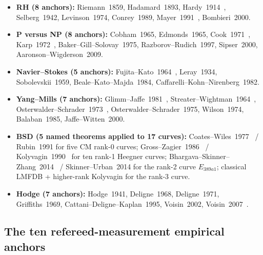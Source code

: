 \documentclass[11pt,a4paper]{amsart}
\theoremstyle{plain}
\theoremstyle{definition}
\begin{document}
\begin{itemize}[itemsep=2pt]
\item \textbf{RH (8 anchors):} Riemann~1859, Hadamard~1893, Hardy~1914~\cite{hardy1914}, Selberg~1942, Levinson~1974, Conrey~1989, Mayer~1991~\cite{mayer1991}, Bombieri~2000.
\item \textbf{P versus NP (8 anchors):} Cobham~1965, Edmonds~1965, Cook~1971~\cite{cook1971}, Karp~1972~\cite{karp1972}, Baker--Gill--Solovay~1975, Razborov--Rudich~1997, Sipser~2000, Aaronson--Wigderson~2009.
\item \textbf{Navier--Stokes (5 anchors):} Fujita--Kato~1964~\cite{fujita-kato1964}, Leray~1934, Sobolevskii~1959, Beale--Kato--Majda~1984, Caffarelli--Kohn--Nirenberg~1982.
\item \textbf{Yang--Mills (7 anchors):} Glimm--Jaffe~1981~\cite{glimm-jaffe1981}, Streater--Wightman~1964~\cite{streater-wightman1964}, Osterwalder--Schrader~1973~\cite{osterwalder-schrader1973}, Osterwalder--Schrader~1975, Wilson~1974, Balaban~1985, Jaffe--Witten~2000.
\item \textbf{BSD (5 named theorems applied to 17 curves):} Coates--Wiles~1977~\cite{coates-wiles1977} / Rubin~1991 for five CM rank-0 curves; Gross--Zagier~1986~\cite{gross-zagier1986} / Kolyvagin~1990~\cite{kolyvagin1990} for ten rank-1 Heegner curves; Bhargava--Skinner--Zhang~2014~\cite{bhargava-skinner-zhang2014} / Skinner--Urban~2014 for the rank-2 curve $E_{389a1}$; classical LMFDB + higher-rank Kolyvagin for the rank-3 curve.
\item \textbf{Hodge (7 anchors):} Hodge~1941, Deligne~1968, Deligne~1971, Griffiths~1969, Cattani--Deligne--Kaplan~1995, Voisin~2002, Voisin~2007~\cite{voisin2007}.
\end{itemize}

\subsection{The ten refereed-measurement empirical anchors}
\end{document}
